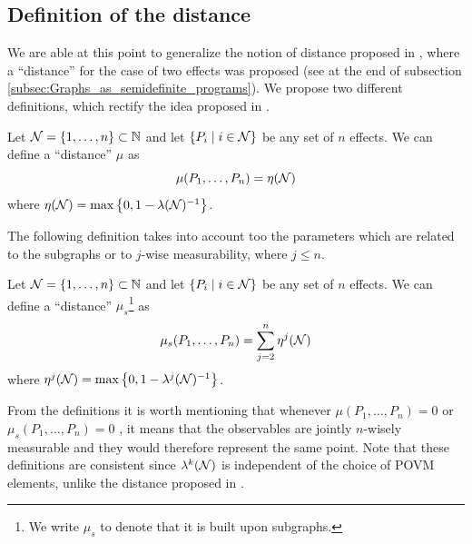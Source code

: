 \documentclass[10pt, a4paper]{amsart}
\begin{document}
\subsection{Definition of the distance}

We are able at this point to generalize the notion of distance proposed in \cite{wolfgarcia}, where a ``distance'' for the case of two 
effects was proposed (see at the end of subsection \ref{subsec:Graphs_as_semidefinite_programs}). We propose two different definitions, which rectify the idea proposed in \cite{wolfgarcia}. 

\begin{definition}
Let $\mathcal{N} = \{1, \ldots , n\}\subset \mathbb{N}$ and let $\{P_{i}\mid i\in \mathcal{N}\}$ be any set of $n$ effects. We can define a ``distance''  $\mu $ as 
$$
\mu ( P_{1}, \ldots , P_{n} )  = 
\eta (\mathcal{N}) 
$$
where $\eta(\mathcal{N}) = \max\left \{ 0,1-\lambda(\mathcal{N})^{-1}\right \}$.
\end{definition}

The following definition takes into account too the parameters which are related to the subgraphs or to $j$-wise measurability, where $j\leq  n$.

\begin{definition}
Let $\mathcal{N} = \{1, \ldots , n\}\subset \mathbb{N}$ and let $\{P_{i}\mid i\in \mathcal{N}\}$ be any set of $n$ effects. We can define a ``distance''  $\mu_{s} $\footnote{We write $\mu_{s}$ to denote that it is built upon subgraphs.} as 
$$
\mu_{s} ( P_{1}, \ldots , P_{n} )  = 
\sum_{j=2}^{n}\eta^{j}(\mathcal{N}) 
$$
where $\eta^{j}(\mathcal{N}) = \max\left \{ 0,1-\lambda^{j}(\mathcal{N})^{-1}\right \}$.
\end{definition}


From the definitions it is worth mentioning that whenever 
$\mu ( P_{1}, \ldots , P_{n} ) = 0$ or $\mu_{s} ( P_{1}, \ldots , P_{n} ) = 0$ , it means that the observables are jointly $n$-wisely measurable and they would therefore represent the same point. Note that these definitions are consistent since $\lambda^{k}(\mathcal{N})$ is independent of the choice of POVM elements, unlike the distance proposed in \cite{wolfgarcia}.\\



\newpage
\end{document}
